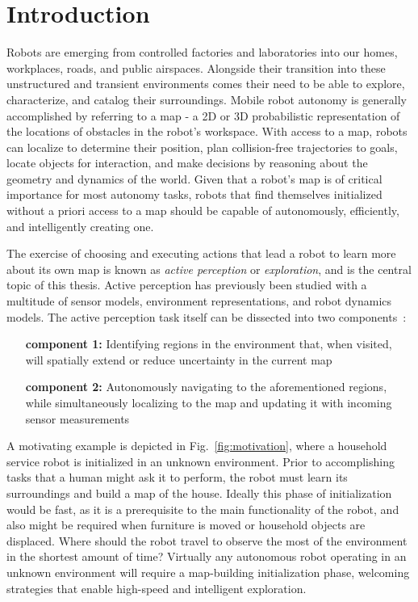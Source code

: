 \chapter{Introduction}
\label{chapter1}

Robots are emerging from controlled factories and
laboratories into our homes, workplaces, roads, and public airspaces.
Alongside their transition into these unstructured and transient environments
comes their need to be able to explore, characterize, and catalog their surroundings.
Mobile robot autonomy is generally accomplished by referring to a map - a 2D or 3D
probabilistic representation of the locations of obstacles in the robot's workspace.
With access to a map, robots can localize to determine their position, plan collision-free
trajectories to goals, locate objects for interaction, and make decisions by
reasoning about the geometry and dynamics of the world. Given that a robot's map
is of critical importance for most autonomy tasks, robots that find
themselves initialized without a priori access to a map should be capable of
autonomously, efficiently, and intelligently creating one.

The exercise of choosing and executing actions that lead a robot to learn more about its own
map is known as \textit{active perception} or \textit{exploration}, and
is the central topic of this thesis. Active perception has previously been studied with a
multitude of sensor models, environment representations, and robot dynamics
models. The active perception task itself can be dissected into two
components~\cite{shen20113d}:

\begin{enumerate}[leftmargin=3.2cm]
  \item[\bf component 1:] Identifying regions in the environment that, when visited, will
    spatially extend or reduce uncertainty in the current map
  \item[\bf component 2:] Autonomously navigating to the aforementioned regions, while
    simultaneously localizing to the map and updating it with incoming sensor
    measurements
\end{enumerate}

A motivating example is depicted in Fig.~\ref{fig:motivation}, where a household
service robot is initialized in an unknown environment. Prior to accomplishing
tasks that a human might ask it to perform, the robot must learn its
surroundings and build a map of the house. Ideally this phase of
initialization would be fast, as it is a prerequisite to the main functionality
of the robot, and also might be required when furniture is moved or
household objects are displaced. Where should the robot travel to observe the
most of the environment in the shortest amount of time? Virtually any autonomous robot
operating in an unknown environment will require a map-building
initialization phase, welcoming strategies that enable high-speed and intelligent
exploration.


